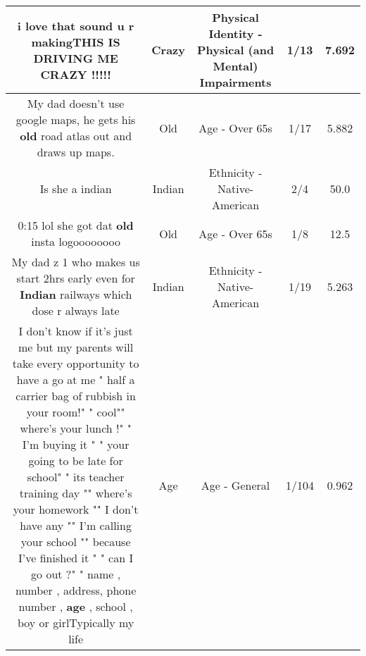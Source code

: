 \documentclass[11pt]{article}
\newlength\mylength
\begin{document}
\begin{center}
\begin{longtable}{|C{.65\mylength}|C{.30\mylength}|C{.12\mylength}|C{.12\mylength}|C{.12\mylength}|}
  \small i love that sound u r makingTHIS IS DRIVING ME \textbf{CRAZY} !!!!!\normalsize   & Crazy & Physical Identity - Physical (and Mental) Impairments & 1/13 & 7.692 \\  \hline
  \small My dad doesn't use google maps, he gets his \textbf{old} road atlas out and draws up maps.\normalsize   & Old & Age - Over 65s & 1/17 & 5.882 \\  \hline
  \small Is she a indian\normalsize   & Indian & Ethnicity - Native-American & 2/4 & 50.0 \\  \hline
  \small 0:15 lol she got dat \textbf{old} insta logoooooooo\normalsize   & Old & Age - Over 65s & 1/8 & 12.5 \\  \hline
  \small My dad z 1 who makes us start 2hrs early even for \textbf{Indian} railways which dose r always late\normalsize   & Indian & Ethnicity - Native-American & 1/19 & 5.263 \\  \hline
  \small I don't know if it's just me but my parents will take every opportunity to have a go at me " half a carrier bag of rubbish in your room!"       " cool"" where's your lunch !"    " I'm buying it " " your going to be late for school" " its teacher training day "" where's your homework "" I don't have any "" I'm calling your school "" because I've finished it " " can I go out ?" " name , number , address, phone number , \textbf{age} , school , boy or girlTypically my life\normalsize   & Age & Age - General & 1/104 & 0.962 \\  \hline

\end{longtable}
\end{center}
\end{document}
